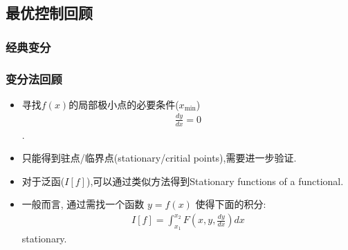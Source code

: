 \documentclass[UTF8, aspectratio=169, 9pt]{ctexbeamer}
\begin{document}
\subsection{最优控制回顾}
\subsubsection{经典变分}
\begin{frame}
  \frametitle{变分法回顾}
  \begin{itemize}
  \item 寻找$f(x)$的局部极小点的必要条件($x_{\min}$)
    \begin{align*}
      \frac{dy}{dx} = 0
    \end{align*}.
  \item 只能得到驻点/临界点(stationary/critial points),需要进一步验证.
  \item 对于泛函($I[f]$),可以通过类似方法得到Stationary functions of a functional.
  \item 一般而言, 通过需找一个函数 $y=f(x)$ 使得下面的积分:
    \begin{align*}
      I[f] = \int_{x_1}^{x_2} F( x, y, \frac{dy}{dx} ) dx
    \end{align*}
    stationary.
  \end{itemize}
\end{frame}
\end{document}
